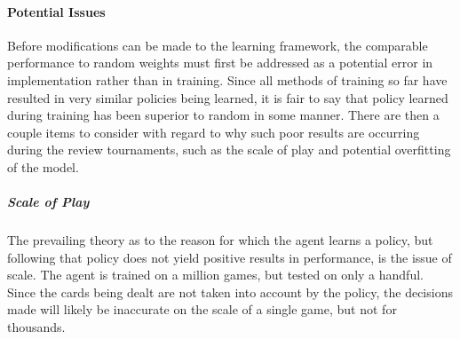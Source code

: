 
\paragraph*{Potential Issues}
\label{sec:findings-r2-potentialissues}

Before modifications can be made to the learning framework,
the comparable performance to random weights must first be addressed as a potential
error in implementation rather than in training.
%
Since all methods of training so far have resulted in very similar policies
being learned,
it is fair to say that policy learned during training has been superior to
random in some manner.
%
There are then a couple items to consider with regard to why such poor results are occurring
during the review tournaments,
such as the scale of play and potential overfitting of the model.




\subparagraph*{Scale of Play}

The prevailing theory as to the reason for which the agent learns a policy,
but following that policy does not yield positive results in performance,
is the issue of scale.
%
The agent is trained on a million games,
but tested on only a handful.
%
Since the cards being dealt are not taken into account by the policy,
the decisions made will likely be inaccurate on the scale of a single game,
but not for thousands.



